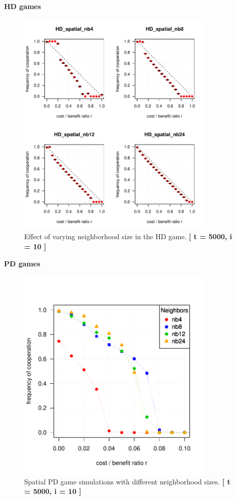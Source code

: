 \textbf{HD games}

\begin{figure}[H]
	\centering 
	\includegraphics[width=9.5cm]{task2_4plot}
	\caption{Effect of varying neighborhood size in the HD game.  \textbf{[ t = 5000, i = 10 ]} }\label{fig: task2_4plot}
\end{figure}



\textbf{PD games} 


\begin{figure}[H]
	\centering 
	\includegraphics[width=9.5cm]{task2_multiplot}
	\caption{Spatial PD game simulations with different neighborhood sizes.  \textbf{[ t = 5000, i = 10 ]} }\label{fig: task2_multiplot}
\end{figure}


